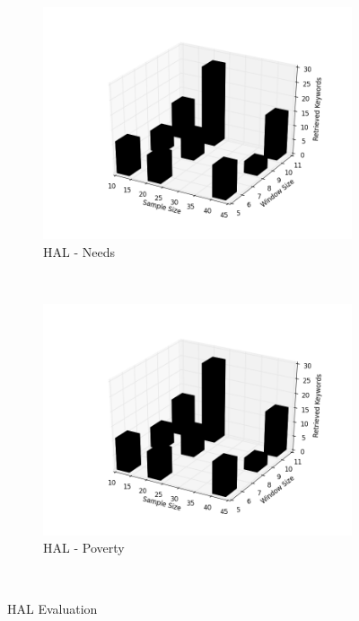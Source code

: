\begin{figure}[H]
           \begin{subfigure}[b]{0.45\textwidth}
                \includegraphics[width=\textwidth]{img/lex/needs_hal_2}
                \caption{HAL - Needs}
                \label{fig:al_price}
        \end{subfigure}%
        ~ %
       \begin{subfigure}[b]{0.45\textwidth}
                \includegraphics[width=\textwidth]{img/lex/needs_hal_2}
                \caption{HAL - Poverty}
                \label{fig:al_price}
        \end{subfigure}%
        ~ %

        \caption{HAL Evaluation}\label{fig:price_supply}
\end{figure}




